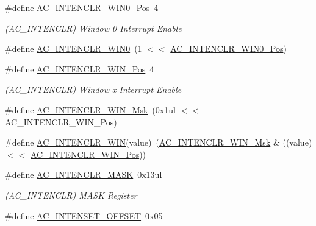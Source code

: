 \begin{DoxyCompactItemize}
\item 
\#define \mbox{\hyperlink{group___s_a_m_d21___a_c_ga8743138d490de623c23681827c5f9ed7}{A\+C\+\_\+\+I\+N\+T\+E\+N\+C\+L\+R\+\_\+\+W\+I\+N0\+\_\+\+Pos}}~4
\begin{DoxyCompactList}\small\item\em (A\+C\+\_\+\+I\+N\+T\+E\+N\+C\+LR) Window 0 Interrupt Enable \end{DoxyCompactList}\item 
\#define \mbox{\hyperlink{group___s_a_m_d21___a_c_gab32e8e68c2e625ac96bde6a8f6d42f35}{A\+C\+\_\+\+I\+N\+T\+E\+N\+C\+L\+R\+\_\+\+W\+I\+N0}}~(1 $<$$<$ \mbox{\hyperlink{group___s_a_m_d21___a_c_ga8743138d490de623c23681827c5f9ed7}{A\+C\+\_\+\+I\+N\+T\+E\+N\+C\+L\+R\+\_\+\+W\+I\+N0\+\_\+\+Pos}})
\item 
\#define \mbox{\hyperlink{group___s_a_m_d21___a_c_ga0db0a40e376eff9df159115da9de0920}{A\+C\+\_\+\+I\+N\+T\+E\+N\+C\+L\+R\+\_\+\+W\+I\+N\+\_\+\+Pos}}~4
\begin{DoxyCompactList}\small\item\em (A\+C\+\_\+\+I\+N\+T\+E\+N\+C\+LR) Window x Interrupt Enable \end{DoxyCompactList}\item 
\#define \mbox{\hyperlink{group___s_a_m_d21___a_c_gab4294d48eadea96d023982f380d46e16}{A\+C\+\_\+\+I\+N\+T\+E\+N\+C\+L\+R\+\_\+\+W\+I\+N\+\_\+\+Msk}}~(0x1ul $<$$<$ A\+C\+\_\+\+I\+N\+T\+E\+N\+C\+L\+R\+\_\+\+W\+I\+N\+\_\+\+Pos)
\item 
\#define \mbox{\hyperlink{group___s_a_m_d21___a_c_ga769748a638fde3114b53f42ef6e69bb0}{A\+C\+\_\+\+I\+N\+T\+E\+N\+C\+L\+R\+\_\+\+W\+IN}}(value)~(\mbox{\hyperlink{group___s_a_m_d21___a_c_gab4294d48eadea96d023982f380d46e16}{A\+C\+\_\+\+I\+N\+T\+E\+N\+C\+L\+R\+\_\+\+W\+I\+N\+\_\+\+Msk}} \& ((value) $<$$<$ \mbox{\hyperlink{group___s_a_m_d21___a_c_ga0db0a40e376eff9df159115da9de0920}{A\+C\+\_\+\+I\+N\+T\+E\+N\+C\+L\+R\+\_\+\+W\+I\+N\+\_\+\+Pos}}))
\item 
\#define \mbox{\hyperlink{group___s_a_m_d21___a_c_ga9c1df17ec7ebc764d76c0432181c94a2}{A\+C\+\_\+\+I\+N\+T\+E\+N\+C\+L\+R\+\_\+\+M\+A\+SK}}~0x13ul
\begin{DoxyCompactList}\small\item\em (A\+C\+\_\+\+I\+N\+T\+E\+N\+C\+LR) M\+A\+SK Register \end{DoxyCompactList}\item 
\#define \mbox{\hyperlink{group___s_a_m_d21___a_c_gace22713b52e7875bc9d364ff71821f03}{A\+C\+\_\+\+I\+N\+T\+E\+N\+S\+E\+T\+\_\+\+O\+F\+F\+S\+ET}}~0x05
$$
\end{DoxyCompactItemize}
